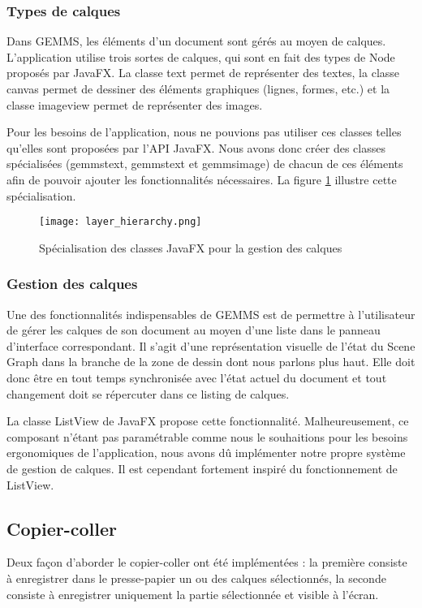 \subsubsection{Types de calques}
Dans GEMMS, les éléments d'un document sont gérés au moyen de calques. L'application utilise trois sortes de calques, qui sont en fait des types de Node proposés par JavaFX. La classe \gls{text} permet de représenter des textes, la classe \gls{canvas} permet de dessiner des éléments graphiques (lignes, formes, etc.) et la classe \gls{imageview} permet de représenter des images. 

Pour les besoins de l'application, nous ne pouvions pas utiliser ces classes telles qu'elles sont proposées par l'API JavaFX. Nous avons donc créer des classes spécialisées (\gls{gemmstext}, \gls{gemmstext} et  \gls{gemmsimage}) de chacun de ces éléments afin de pouvoir ajouter les fonctionnalités nécessaires. La figure \ref{fig:layer_hierarchy} illustre cette spécialisation.

\begin{figure}[H]
	\caption{Spécialisation des classes JavaFX pour la gestion des calques}
	\centering
	\texttt{[image: layer\_hierarchy.png]}
	\label{fig:layer_hierarchy}
\end{figure}


\subsubsection{Gestion des calques}

Une des fonctionnalités indispensables de GEMMS est de permettre à l'utilisateur de gérer les calques de son document au moyen d'une liste dans le panneau d'interface correspondant. Il s'agit d'une représentation visuelle de l'état du Scene Graph dans la branche de la zone de dessin dont nous parlons plus haut. Elle doit donc être en tout temps synchronisée avec l'état actuel du document et tout changement doit se répercuter dans ce listing de calques.

La classe ListView de JavaFX propose cette fonctionnalité. Malheureusement, ce composant n'étant pas paramétrable comme nous le souhaitions pour les besoins ergonomiques de l'application, nous avons dû implémenter notre propre système de gestion de calques. Il est cependant fortement inspiré du fonctionnement de ListView.

\subsection{Copier-coller}
\label{sec:copiercoller}
Deux façon d'aborder le copier-coller ont été implémentées : la première consiste à enregistrer dans le presse-papier un ou des calques sélectionnés, la seconde consiste à enregistrer uniquement la partie sélectionnée et visible à l'écran.

